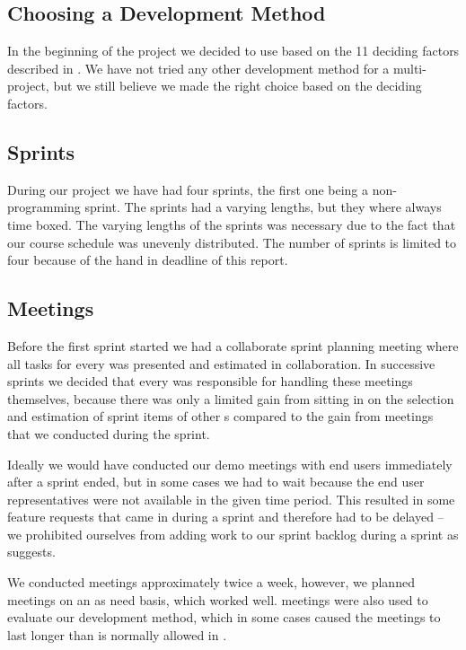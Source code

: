 \subsection{Choosing a Development Method}
In the beginning of the project we decided to use \sos{} based on the 11 deciding factors described in .
We have not tried any other development method for a multi-project, but we still believe we made the right choice based on the deciding factors.


\subsection{Sprints}
During our project we have had four sprints, the first one being a non-programming sprint.
The sprints had a varying lengths, but they where always time boxed. 
The varying lengths of the sprints was necessary due to the fact that our course schedule was unevenly distributed. 
The number of sprints is limited to four because of the hand in deadline of this report.




\subsection{Meetings}
\label{sub:interdevmeet}
Before the first sprint started we had a collaborate sprint planning meeting where all tasks for every \subgroup{} was presented and estimated in collaboration.
In successive sprints we decided that every \subgroup{} was responsible for handling these meetings themselves, because there was only a limited gain from sitting in on the selection and estimation of sprint items of other \subgroup{}s  compared to the gain from \sos{} meetings that we conducted during the sprint.

Ideally we would have conducted our demo meetings with end users immediately after a sprint ended, but in some cases we had to wait because the end user representatives were not available in the given time period.
This resulted in some feature requests that came in during a sprint and therefore had to be delayed -- we prohibited ourselves from adding work to our sprint backlog during a sprint as \scrum{} suggests.

We conducted \sos{} meetings approximately twice a week, however, we planned meetings on an as need basis, which worked well.
\sos{} meetings were also used to evaluate our development method, which in some cases caused the meetings to last longer than is normally allowed in \sos{}.

